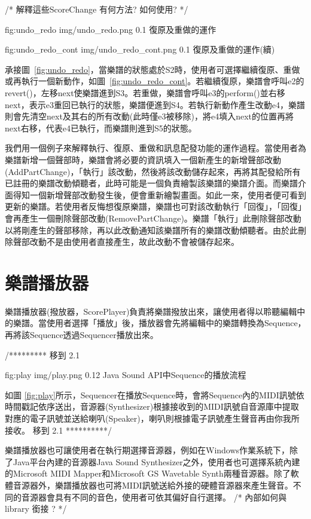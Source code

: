 \documentclass[12pt,a4paper,oneside]{report}
\begin{document}
/*  
解釋這些ScoreChange 有何方法? 如何使用?   
*/ 


\figurewithcaption
{fig:undo_redo}
{img/undo_redo.png}
{0.1}
{復原及重做的運作}

\figurewithcaption
{fig:undo_redo_cont}
{img/undo_redo_cont.png}
{0.1}
{復原及重做的運作(續)}

承接圖~\ref{fig:undo_redo}，當樂譜的狀態處於S2時，使用者可選擇繼續復原、重做或再執行一個新動作，如圖~\ref{fig:undo_redo_cont}。若繼續復原，樂譜會呼叫e2的revert()，左移next使樂譜進到S3。若重做，樂譜會呼叫e3的perform()並右移next，表示e3重回已執行的狀態，樂譜便進到S4。若執行新動作產生改動e4，樂譜則會先清空next及其右的所有改動(此時僅e3被移除)，將e4填入next的位置再將next右移，代表e4已執行，而樂譜則進到S5的狀態。

我們用一個例子來解釋執行、復原、重做和訊息配發功能的運作過程。當使用者為樂譜新增一個聲部時，樂譜會將必要的資訊填入一個新產生的新增聲部改動(AddPartChange)，「執行」該改動，然後將該改動儲存起來，再將其配發給所有已註冊的樂譜改動傾聽者，此時可能是一個負責繪製該樂譜的樂譜介面。而樂譜介面得知一個新增聲部改動發生後，便會重新繪製畫面。如此一來，使用者便可看到更新的樂譜。若使用者反悔想復原樂譜，樂譜也可對該改動執行「回復」，「回復」會再產生一個刪除聲部改動(RemovePartChange)。樂譜「執行」此刪除聲部改動以將剛產生的聲部移除，再以此改動通知該樂譜所有的樂譜改動傾聽者。由於此刪除聲部改動不是由使用者直接產生，故此改動不會被儲存起來。

\section{樂譜播放器}

樂譜播放器(撥放器，ScorePlayer)負責將樂譜撥放出來，讓使用者得以聆聽編輯中的樂譜。當使用者選擇「播放」後，播放器會先將編輯中的樂譜轉換為Sequence，再將該Sequence透過Sequencer播放出來。

/*********  移到 2.1 

\figurewithcaption
{fig:play}
{img/play.png}
{0.12}
{Java Sound API中Sequence的播放流程}

如圖 \ref{fig:play}所示，Sequencer在播放Sequence時，會將Sequence內的MIDI訊號依時間戳記依序送出，音源器(Synthesizer)根據接收到的MIDI訊號自音源庫中提取對應的電子訊號並送給喇叭(Speaker)，喇叭則根據電子訊號產生聲音再由你我所接收。
移到 2.1    **********/ 


樂譜播放器也可讓使用者在執行期選擇音源器，例如在Windows作業系統下，除了Java平台內建的音源器Java Sound Synthesizer之外，使用者也可選擇系統內建的Microsoft MIDI Mapper和Microsoft GS Wavetable Synth兩種音源器。除了軟體音源器外，樂譜播放器也可將MIDI訊號送給外接的硬體音源器來產生聲音。不同的音源器會具有不同的音色，使用者可依其偏好自行選擇。 /* 內部如何與library 銜接 ?  */
\end{document}
